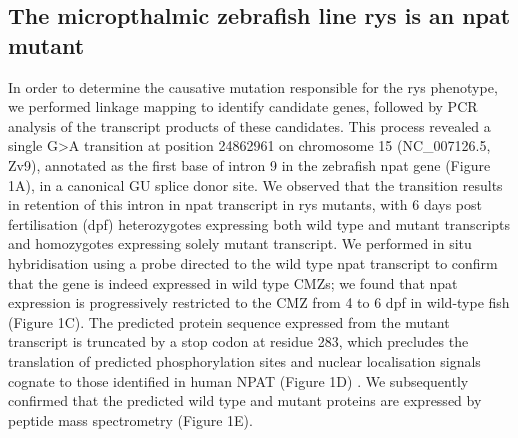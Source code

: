 \subsection{The micropthalmic zebrafish line rys is an npat mutant}

In order to determine the causative mutation responsible for the rys phenotype, we performed linkage mapping to identify candidate genes, followed by PCR analysis of the transcript products of these candidates. This process revealed a single G\textgreater{}A transition at position 24862961 on chromosome 15 (NC\_007126.5, Zv9), annotated as the first base of intron 9 in the zebrafish npat gene (Figure 1A), in a canonical GU splice donor site. We observed that the transition results in retention of this intron in npat transcript in rys mutants, with 6 days post fertilisation (dpf) heterozygotes expressing both wild type and mutant transcripts and homozygotes expressing solely mutant transcript. We performed in situ hybridisation using a probe directed to the wild type npat transcript to confirm that the gene is indeed expressed in wild type CMZs; we found that npat expression is progressively restricted to the CMZ from 4 to 6 dpf in wild-type fish (Figure 1C). The predicted protein sequence expressed from the mutant transcript is truncated by a stop codon at residue 283, which precludes the translation of predicted phosphorylation sites and nuclear localisation signals cognate to those identified in human NPAT (Figure 1D) \cite{Ma2000,Sagara2002}. We subsequently confirmed that the predicted wild type and mutant proteins are expressed by peptide mass spectrometry (Figure 1E). 


